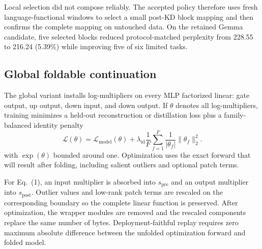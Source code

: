 \documentclass[10pt]{article}
\begin{document}
Local selection did not compose reliably. The accepted policy therefore uses
fresh language-functional windows to select a small post-KD block mapping and
then confirms the complete mapping on untouched data. On the retained Gemma
candidate, five selected blocks reduced protocol-matched perplexity from
228.55 to 216.24 (5.39\%) while improving five of six limited tasks.

\subsection{Global foldable continuation}

The global variant installs log-multipliers on every MLP factorized linear:
gate output, up output, down input, and down output. If $\theta$ denotes all
log-multipliers, training minimizes a held-out reconstruction or distillation
loss plus a family-balanced identity penalty
\[
 \mathcal L(\theta)=\mathcal L_{\mathrm{model}}(\theta)
 +\lambda_{\mathrm{id}}\frac{1}{F}\sum_{f=1}^F
 \frac{1}{|\theta_f|}\|\theta_f\|_2^2.
 \tag{12}
\]
with $\exp(\theta)$ bounded around one. Optimization uses the exact forward
that will result after folding, including salient outliers and optional patch
terms.

For Eq.~(1), an input multiplier is absorbed into
$s_{\mathrm{pre}}$ and an output multiplier into $s_{\mathrm{post}}$.
Outlier values and low-rank patch terms are rescaled on the corresponding
boundary so the complete linear function is preserved. After optimization,
the wrapper modules are removed and the rescaled components replace the same
number of bytes. Deployment-faithful replay requires zero maximum absolute
difference between the unfolded optimization forward and folded model.

\begin{center}
\end{center}
\end{document}
